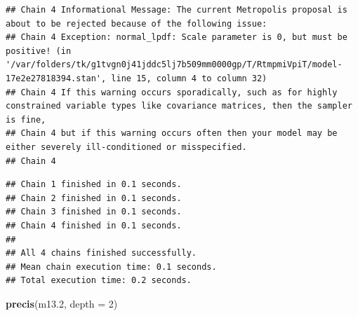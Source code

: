 \documentclass[
]{book}
\newenvironment{Shaded}{\begin{snugshade}}{\end{snugshade}}
\newcommand{\AttributeTok}[1]{\textcolor[rgb]{0.13,0.29,0.53}{#1}}
\newcommand{\DecValTok}[1]{\textcolor[rgb]{0.00,0.00,0.81}{#1}}
\newcommand{\FloatTok}[1]{\textcolor[rgb]{0.00,0.00,0.81}{#1}}
\newcommand{\FunctionTok}[1]{\textcolor[rgb]{0.13,0.29,0.53}{\textbf{#1}}}
\newcommand{\NormalTok}[1]{#1}
\begin{document}
\begin{verbatim}
## Chain 4 Informational Message: The current Metropolis proposal is about to be rejected because of the following issue:
## Chain 4 Exception: normal_lpdf: Scale parameter is 0, but must be positive! (in '/var/folders/tk/g1tvgn0j41jddc5lj7b509mm0000gp/T/RtmpmiVpiT/model-17e2e27818394.stan', line 15, column 4 to column 32)
## Chain 4 If this warning occurs sporadically, such as for highly constrained variable types like covariance matrices, then the sampler is fine,
## Chain 4 but if this warning occurs often then your model may be either severely ill-conditioned or misspecified.
## Chain 4
\end{verbatim}

\begin{verbatim}
## Chain 1 finished in 0.1 seconds.
## Chain 2 finished in 0.1 seconds.
## Chain 3 finished in 0.1 seconds.
## Chain 4 finished in 0.1 seconds.
## 
## All 4 chains finished successfully.
## Mean chain execution time: 0.1 seconds.
## Total execution time: 0.2 seconds.
\end{verbatim}

\begin{Shaded}
\begin{Highlighting}[]
\FunctionTok{precis}\NormalTok{(m13}\FloatTok{.2}\NormalTok{, }\AttributeTok{depth =} \DecValTok{2}\NormalTok{)}
\end{Highlighting}
\end{Shaded}
\end{document}
